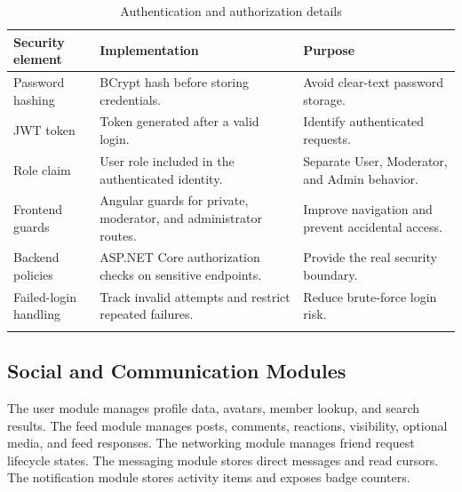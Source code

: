 \begin{longtable}{|m{3.3cm}|m{5.2cm}|m{5.5cm}|}
\hline
\textbf{Security element} & \textbf{Implementation} & \textbf{Purpose} \\
\hline
Password hashing & BCrypt hash before storing credentials. & Avoid clear-text password storage. \\
\hline
JWT token & Token generated after a valid login. & Identify authenticated requests. \\
\hline
Role claim & User role included in the authenticated identity. & Separate User, Moderator, and Admin behavior. \\
\hline
Frontend guards & Angular guards for private, moderator, and administrator routes. & Improve navigation and prevent accidental access. \\
\hline
Backend policies & ASP.NET Core authorization checks on sensitive endpoints. & Provide the real security boundary. \\
\hline
Failed-login handling & Track invalid attempts and restrict repeated failures. & Reduce brute-force login risk. \\
\hline
\caption{Authentication and authorization details}
\end{longtable}

\subsection{Social and Communication Modules}

The user module manages profile data, avatars, member lookup, and search results. The feed module manages posts, comments, reactions, visibility, optional media, and feed responses. The networking module manages friend request lifecycle states. The messaging module stores direct messages and read cursors. The notification module stores activity items and exposes badge counters.

